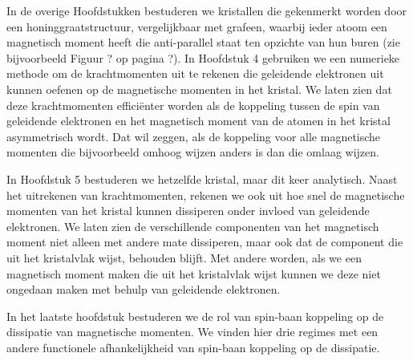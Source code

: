 In de overige Hoofdstukken bestuderen we kristallen die gekenmerkt worden door een honinggraatstructuur, vergelijkbaar met grafeen, waarbij ieder atoom een magnetisch moment heeft die anti-parallel staat ten opzichte van hun buren (zie bijvoorbeeld Figuur ? op pagina ?). In Hoofdstuk 4 gebruiken we een numerieke methode om de krachtmomenten uit te rekenen die geleidende elektronen uit kunnen oefenen op de magnetische momenten in het kristal. We laten zien dat deze krachtmomenten efficiënter worden als de koppeling tussen de spin van geleidende elektronen en het magnetisch moment van de atomen in het kristal asymmetrisch wordt. Dat wil zeggen, als de koppeling voor alle magnetische momenten die bijvoorbeeld omhoog wijzen anders is dan die omlaag wijzen. 

In Hoofdstuk 5 bestuderen we hetzelfde kristal, maar dit keer analytisch. Naast het uitrekenen van krachtmomenten, rekenen we ook uit hoe snel de magnetische momenten van het kristal kunnen dissiperen onder invloed van geleidende elektronen. We laten zien de verschillende componenten van het magnetisch moment niet alleen met andere mate dissiperen, maar ook dat de component die uit het kristalvlak wijst, behouden blijft. Met andere worden, als we een magnetisch moment maken die uit het kristalvlak wijst kunnen we deze niet ongedaan maken met behulp van geleidende elektronen. 

In het laatste hoofdstuk bestuderen we de rol van spin-baan koppeling op de dissipatie van magnetische momenten. We vinden hier drie regimes met een andere functionele afhankelijkheid van spin-baan koppeling op de dissipatie.   

